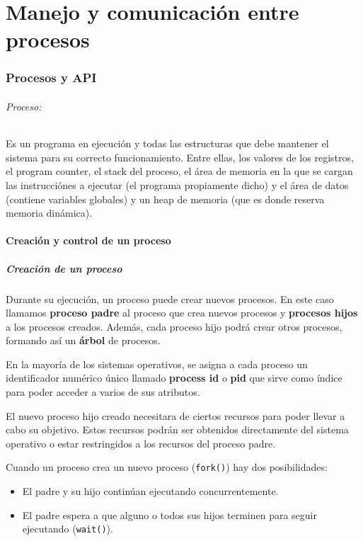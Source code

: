 \part{Manejo y comunicación entre procesos}
\section{Procesos y API}
\paragraph{Proceso:} Es un programa en ejecución y todas las estructuras que debe mantener el sistema para su correcto funcionamiento. Entre ellas, los valores de los registros, el program counter, el stack del proceso, el área de memoria en la que se cargan las instrucciónes a  ejecutar (el programa propiamente dicho) y el área de datos (contiene variables globales) y un heap de memoria (que es donde reserva memoria dinámica).

\subsection{Creación y control de un proceso}
\subsubsection{Creación de un proceso}

Durante su ejecución, un proceso puede crear nuevos procesos. En este caso llamamos \textbf{proceso padre} al proceso que crea nuevos procesos y \textbf{procesos hijos} a los procesos creados. Además, cada proceso hijo podrá crear otros procesos, formando así un \textbf{árbol} de procesos.

En la mayoría de los sistemas operativos, se asigna a cada proceso un identificador numérico único llamado \textbf{process id} o \textbf{pid} que sirve como índice para poder acceder a varios de sus atributos.

El nuevo proceso hijo creado necesitara de ciertos recursos para poder llevar a cabo su objetivo. Estos recursos podrán ser obtenidos directamente del sistema operativo o estar restringidos a los recursos del proceso padre.

Cuando un proceso crea un nuevo proceso (\texttt{fork()}) hay dos posibilidades:

\begin{itemize}
	\item El padre y su hijo continúan ejecutando concurrentemente.
	\item El padre espera a que alguno o todos sus hijos terminen para seguir ejecutando (\texttt{wait()}).
\end{itemize}

